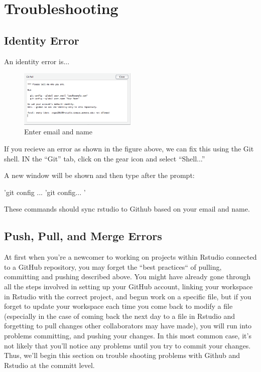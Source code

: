 \documentclass[12pt]{../SOP4_alpha}\usepackage[]{graphicx}\usepackage[]{color}
\begin{document}
\section{Troubleshooting}

\subsection {Identity Error}

\NP An identity error is... 

\begin{figure}[H]
\centering
\includegraphics[width=0.5\textwidth]{graphics/IdentityError.png}
\caption{Enter email and name}
\end{figure}

\NP If you recieve an error as shown in the figure above, we can fix this using the Git shell. IN the ``Git'' tab, click on the gear icon and select ``Shell...'' 

\NP A new window will be shown and then type after the prompt:

'git config ...
'git config... '

\NP These commands should sync rstudio to Github based on your email and name.


\subsection{Push, Pull, and Merge Errors}

\NP At first when you're a newcomer to working on projects within Rstudio connected to a GitHub repository, you may forget the ``best practices`` of pulling, committing and pushing described above. You might have already gone through all the steps involved in setting up your GitHub account, linking your workspace in Rstudio with the correct project, and begun work on a specific file, but if you forget to update your workspace each time you come back to modify a file (especially in the case of coming back the next day to a file in Rstudio and forgetting to pull changes other collaborators may have made), you will run into problems committing, and pushing your changes. In this most common case, it's not likely that you'll notice any problems until you try to commit your changes. Thus, we'll begin this section on trouble shooting problems with Github and Rstudio at the committ level.
\end{document}
